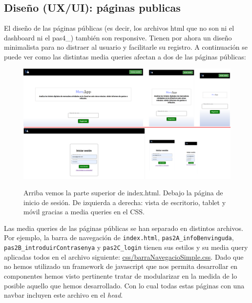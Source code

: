 \documentclass[a4paper,12pt]{report}
\begin{document}
		
		
		
		
		
		
		
	
	\subsection{Diseño (UX/UI): páginas publicas}
	\label{sec:disenyoPublicas}
	
	El diseño de las páginas públicas (es decir, los archivos html que no son ni el dashboard ni el pas4\_) también son responsive. Tienen por ahora un diseño minimalista para no distraer al usuario y facilitarle su registro. A continuación se puede ver como las distintas media queries afectan a dos de las páginas públicas:
	
	\FloatBarrier
	\setlength{\belowcaptionskip}{3pt}
	\begin{figure}[H]
		\centering
		\caption{Arriba vemos la parte superior de index.html. Debajo la página de inicio de sesión. De izquierda a derecha: vista de escritorio, tablet y móvil gracias a media queries en el CSS.}
		\includegraphics[width=1\linewidth]{img/mediaQueryIndexhtml}
		\label{fig:mediaQueryIndexhtml}
	\end{figure}
	\FloatBarrier
	
	Las media queries de las páginas públicas se han separado en distintos archivos. Por ejemplo, la barra de navegación de \texttt{index.html}, \texttt{pas2A\_infoBenvinguda}, \texttt{pas2B\_introduirContrasenya} y \texttt{pas2C\_login} tienen sus estilos y su media query aplicadas todos en el archivo siguiente: \href{https://github.com/blackcub3s/mercApp/blob/main/APP%20WEB/__frontend__produccio__/app/css/barraNavegacioSimple.css}{css/barraNavegacioSimple.css}. Dado que no hemos utilizado un framework de javascript que nos permita desarrollar en componentes hemos visto pertinente tratar de modularizar en la medida de lo posible aquello que hemos desarrollado. Con lo cual todas estas páginas con una navbar incluyen este archivo en el \textit{head}.
	
\end{document}
